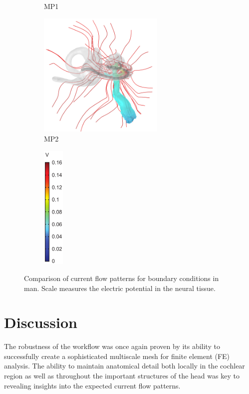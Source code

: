 \begin{figure}
\begin{subfigure}[t]{0.4\textwidth}
        \caption{MP1}
        \label{fig:bc_streams_mp1}
    \end{subfigure}%
    \begin{subfigure}[t]{0.4\textwidth}
        \centering
        \includegraphics[width=6cm]{Simulations/BCs/Streamlines_MP2}
        \caption{MP2}
        \label{fig:bc_streams_mp2}
    \end{subfigure}%
    \begin{subfigure}[t]{0.1\textwidth}
        \centering
        \includegraphics[height=6cm]{Simulations/BCs/legend_coh_volt}
    \end{subfigure}%
    
	\caption[Comparison of current flow patterns]{Comparison of current flow
	patterns for boundary conditions in man. Scale measures the electric potential
	in the neural tissue.}
	\label{fig:bc_streams_man}
\end{figure}

\section{Discussion}

The robustness of the workflow was once again proven by its ability to
successfully create a sophisticated multiscale mesh for finite element (FE)
analysis. The ability to maintain anatomical detail both locally in the cochlear
region as well as throughout the important structures of the head was key to
revealing insights into the expected current flow patterns.

